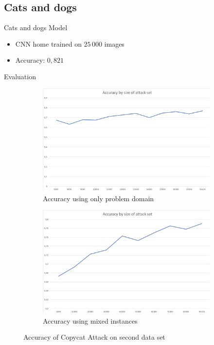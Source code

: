 \documentclass[10pt]{beamer}
\begin{document}
\subsection[Cats and dogs]{Cats and dogs}
\begin{frame}[fragile]{Cats and dogs Model}
\begin{itemize}
\item CNN home trained on $25\,000$ images
\item Accuracy: $0,821$
\end{itemize}
\end{frame}
\begin{frame}[fragile]{Evaluation}
                \begin{figure}[h!]
            \centering
            \begin{subfigure}[c]{0.49\textwidth}
                \centering
                \includegraphics[width=1\textwidth]{exercise_3/paper/images/Accuracy_copy_cat_domain.png}
                \caption{Accuracy using only problem domain}
                \label{fig:Accuracy_Cat_domain}
            \end{subfigure}
            \begin{subfigure}[c]{0.49\textwidth}
                \centering
                \includegraphics[width=1\textwidth]{exercise_3/paper/images/Accuracy_copy_cat.png}
                \caption{Accuracy using mixed instances }
                \label{fig:Accuracy_cat_mix}
            \end{subfigure}
            \caption{Accuracy of Copycat Attack on second data set}
            \label{fig:accuracy_cat}
        \end{figure}
\end{frame}
\end{document}
